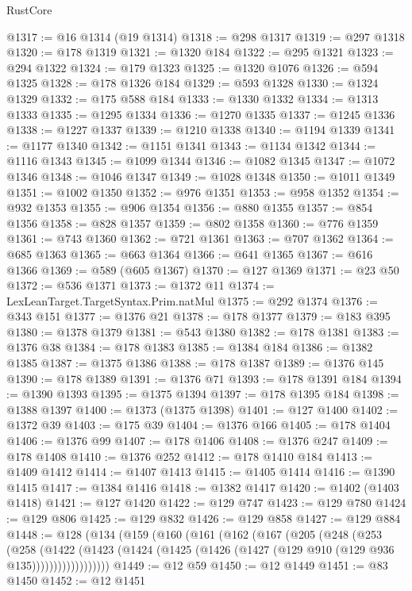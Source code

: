 \begin{lexlean}{RustCore}
\begin{coremodule}
@1317 := @16 @1314 (@19 @1314)
@1318 := @298 @1317
@1319 := @297 @1318
@1320 := @178 @1319
@1321 := @1320 @184
@1322 := @295 @1321
@1323 := @294 @1322
@1324 := @179 @1323
@1325 := @1320 @1076
@1326 := @594 @1325
@1328 := @178 @1326 @184
@1329 := @593 @1328
@1330 := @1324 @1329
@1332 := @175 @588 @184
@1333 := @1330 @1332
@1334 := @1313 @1333
@1335 := @1295 @1334
@1336 := @1270 @1335
@1337 := @1245 @1336
@1338 := @1227 @1337
@1339 := @1210 @1338
@1340 := @1194 @1339
@1341 := @1177 @1340
@1342 := @1151 @1341
@1343 := @1134 @1342
@1344 := @1116 @1343
@1345 := @1099 @1344
@1346 := @1082 @1345
@1347 := @1072 @1346
@1348 := @1046 @1347
@1349 := @1028 @1348
@1350 := @1011 @1349
@1351 := @1002 @1350
@1352 := @976 @1351
@1353 := @958 @1352
@1354 := @932 @1353
@1355 := @906 @1354
@1356 := @880 @1355
@1357 := @854 @1356
@1358 := @828 @1357
@1359 := @802 @1358
@1360 := @776 @1359
@1361 := @743 @1360
@1362 := @721 @1361
@1363 := @707 @1362
@1364 := @685 @1363
@1365 := @663 @1364
@1366 := @641 @1365
@1367 := @616 @1366
@1369 := @589 (@605 @1367)
@1370 := @127 @1369
@1371 := @23 @50
@1372 := @536 @1371
@1373 := @1372 @11
@1374 := LexLeanTarget.TargetSyntax.Prim.natMul
@1375 := @292 @1374
@1376 := @343 @151
@1377 := @1376 @21
@1378 := @178 @1377
@1379 := @183 @395
@1380 := @1378 @1379
@1381 := @543 @1380
@1382 := @178 @1381
@1383 := @1376 @38
@1384 := @178 @1383
@1385 := @1384 @184
@1386 := @1382 @1385
@1387 := @1375 @1386
@1388 := @178 @1387
@1389 := @1376 @145
@1390 := @178 @1389
@1391 := @1376 @71
@1393 := @178 @1391 @184
@1394 := @1390 @1393
@1395 := @1375 @1394
@1397 := @178 @1395 @184
@1398 := @1388 @1397
@1400 := @1373 (@1375 @1398)
@1401 := @127 @1400
@1402 := @1372 @39
@1403 := @175 @39
@1404 := @1376 @166
@1405 := @178 @1404
@1406 := @1376 @99
@1407 := @178 @1406
@1408 := @1376 @247
@1409 := @178 @1408
@1410 := @1376 @252
@1412 := @178 @1410 @184
@1413 := @1409 @1412
@1414 := @1407 @1413
@1415 := @1405 @1414
@1416 := @1390 @1415
@1417 := @1384 @1416
@1418 := @1382 @1417
@1420 := @1402 (@1403 @1418)
@1421 := @127 @1420
@1422 := @129 @747
@1423 := @129 @780
@1424 := @129 @806
@1425 := @129 @832
@1426 := @129 @858
@1427 := @129 @884
@1448 := @128
    (@134
      (@159
        (@160
          (@161
            (@162
              (@167
                (@205
                  (@248
                    (@253
                      (@258
                        (@1422
                          (@1423
                            (@1424 (@1425 (@1426 (@1427 (@129 @910 (@129 @936 @135))))))))))))))))))
@1449 := @12 @59
@1450 := @12 @1449
@1451 := @83 @1450
@1452 := @12 @1451

\end{coremodule}
\end{lexlean}
